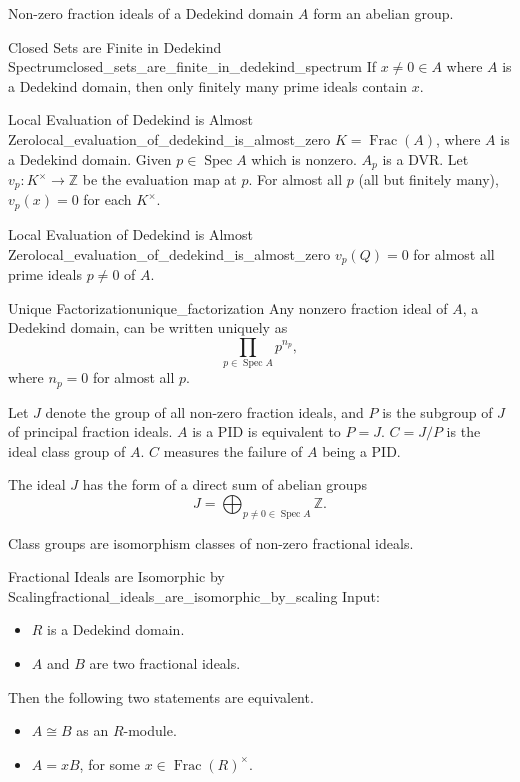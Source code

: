 \documentclass{article}
\begin{document}
Non-zero fraction ideals of a Dedekind domain $A$ form an abelian group.

\begin{proposition}{Closed Sets are Finite in Dedekind Spectrum}{closed_sets_are_finite_in_dedekind_spectrum}
    If $x\neq 0\in A$ where $A$ is a Dedekind domain, then only finitely many prime ideals contain $x$.
\end{proposition}

\begin{corollary}{Local Evaluation of Dedekind is Almost Zero}{local_evaluation_of_dedekind_is_almost_zero}
    $K = \operatorname{Frac}(A)$, where $A$ is a Dedekind domain.
    Given $p\in \operatorname{Spec} A$ which is nonzero.
    $A_p$ is a DVR.
    Let $v_p: K^\times \rightarrow \mathbb{Z}$ be the evaluation map at $p$.
    For almost all $p$ (all but finitely many), $v_p(x) = 0$ for each $K^\times$.
\end{corollary}

\begin{corollary}{Local Evaluation of Dedekind is Almost Zero}{local_evaluation_of_dedekind_is_almost_zero}
    $v_p(Q) = 0$ for almost all prime ideals $p\neq 0$ of $A$.
\end{corollary}

\begin{proposition}{Unique Factorization}{unique_factorization}
    Any nonzero fraction ideal of $A$, a Dedekind domain, can be written uniquely as
    \[ \prod_{p\in \operatorname{Spec} A} p^{n_p}, \]
    where $n_p = 0$ for almost all $p$.
\end{proposition}

Let $J$ denote the group of all non-zero fraction ideals, and $P$ is the subgroup of $J$ of principal fraction ideals.
$A$ is a PID is equivalent to $P=J$.
$C = J/P$ is the ideal class group of $A$.
$C$ measures the failure of $A$ being a PID.
\par
The ideal $J$ has the form of a direct sum of abelian groups
\[ J = \bigoplus_{p\neq 0 \in \operatorname{Spec} A} \mathbb{Z}. \]
\par
Class groups are isomorphism classes of non-zero fractional ideals.

\begin{proposition}{Fractional Ideals are Isomorphic by Scaling}{fractional_ideals_are_isomorphic_by_scaling}
    Input:
    \begin{itemize}
        \item $R$ is a Dedekind domain.
        \item $A$ and $B$ are two fractional ideals.
    \end{itemize}
    Then the following two statements are equivalent.
    \begin{itemize}
        \item $A\cong B$ as an $R$-module.
        \item $A = xB$, for some $x\in \operatorname{Frac}(R)^\times$.
    \end{itemize}
\end{proposition}
\end{document}
